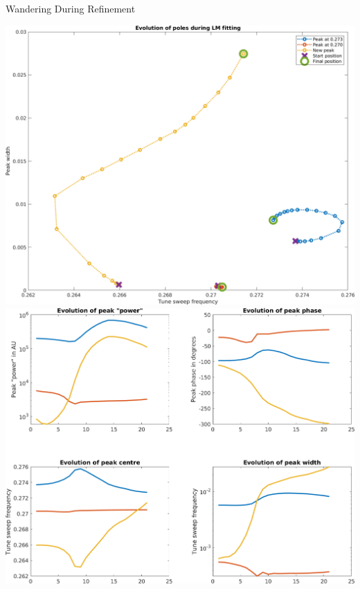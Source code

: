 \documentclass[aspectratio=169, xcolor=table]{beamer}
\begin{document}
%
\begin{frame}{Wandering During Refinement}

\includegraphics[width=0.48\linewidth]{hard-fit-fail-poles.png}
\quad
\includegraphics[width=0.48\linewidth]{hard-fit-fail-evolve.png}

\end{frame}
\end{document}
